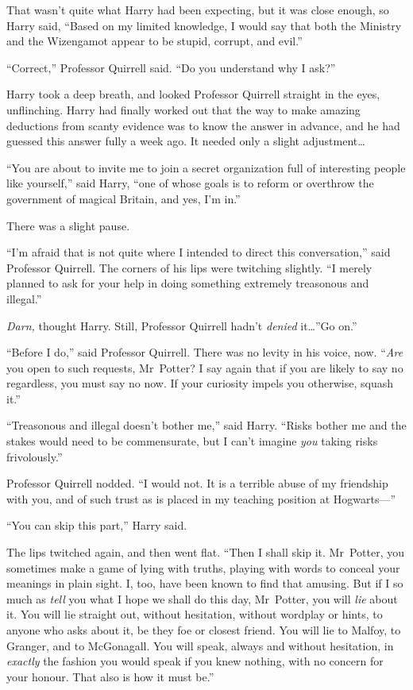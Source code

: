 That wasn’t quite what Harry had been expecting, but it was close enough, so Harry said, “Based on my limited knowledge, I would say that both the Ministry and the Wizengamot appear to be stupid, corrupt, and evil.”

“Correct,” Professor Quirrell said. “Do you understand why I ask?”

Harry took a deep breath, and looked Professor Quirrell straight in the eyes, unflinching. Harry had finally worked out that the way to make amazing deductions from scanty evidence was to know the answer in advance, and he had guessed this answer fully a week ago. It needed only a slight adjustment…

“You are about to invite me to join a secret organization full of interesting people like yourself,” said Harry, “one of whose goals is to reform or overthrow the government of magical Britain, and yes, I’m in.”

There was a slight pause.

“I’m afraid that is not quite where I intended to direct this conversation,” said Professor Quirrell. The corners of his lips were twitching slightly. “I merely planned to ask for your help in doing something extremely treasonous and illegal.”

\emph{Darn,} thought Harry. Still, Professor Quirrell hadn’t \emph{denied} it…”Go on.”

“Before I do,” said Professor Quirrell. There was no levity in his voice, now. “\emph{Are} you open to such requests, Mr~Potter? I say again that if you are likely to say no regardless, you must say no now. If your curiosity impels you otherwise, squash it.”

“Treasonous and illegal doesn’t bother me,” said Harry. “Risks bother me and the stakes would need to be commensurate, but I can’t imagine \emph{you} taking risks frivolously.”

Professor Quirrell nodded. “I would not. It is a terrible abuse of my friendship with you, and of such trust as is placed in my teaching position at Hogwarts—”

“You can skip this part,” Harry said.

The lips twitched again, and then went flat. “Then I shall skip it. Mr~Potter, you sometimes make a game of lying with truths, playing with words to conceal your meanings in plain sight. I, too, have been known to find that amusing. But if I so much as \emph{tell} you what I hope we shall do this day, Mr~Potter, you will \emph{lie} about it. You will lie straight out, without hesitation, without wordplay or hints, to anyone who asks about it, be they foe or closest friend. You will lie to Malfoy, to Granger, and to McGonagall. You will speak, always and without hesitation, in \emph{exactly} the fashion you would speak if you knew nothing, with no concern for your honour. That also is how it must be.”

